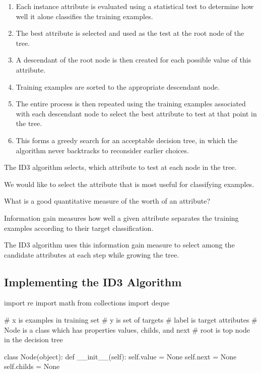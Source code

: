 \documentclass[%
oneside,                 %
final,                   %
10pt]{article}
\begin{document}
\begin{enumerate}
\item Each instance attribute is evaluated using a statistical test to determine how well it alone classifies the training examples.

\item The best attribute is selected and used as the test at the root node of the tree.

\item A descendant of the root node is then created for each possible value of this attribute.

\item Training examples are sorted to the appropriate descendant node.

\item The entire process is then repeated using the training examples associated with each descendant node to select the best attribute to test at that point in the tree.

\item This forms a greedy search for an acceptable decision tree, in which the algorithm never backtracks to reconsider earlier choices. 
\end{enumerate}

\noindent
The ID3 algorithm selects, which attribute to test at each node in the
tree.

We would like to select the attribute that is most useful for classifying
examples.

What is a good quantitative measure of the worth of an attribute?

Information gain measures how well a given attribute separates the
training examples according to their target classification.

The ID3 algorithm uses this information gain measure to select among the candidate
attributes at each step while growing the tree.

\subsection{Implementing the ID3 Algorithm}

\bpycod
import re
import math
from collections import deque

# x is examples in training set
# y is set of targets
# label is target attributes
# Node is a class which has properties values, childs, and next
# root is top node in the decision tree

class Node(object):
	def __init__(self):
		self.value = None
		self.next = None
		self.childs = None
\end{document}
